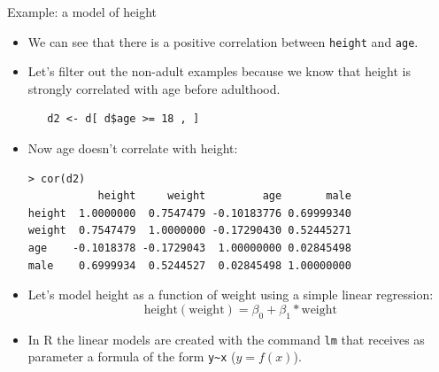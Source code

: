 \documentclass[handout]{beamer}
\begin{document}
\begin{frame}[fragile]{Example: a model of height}
\scriptsize{
\begin{itemize}
 \item We can see that there is a positive correlation between \verb+height+ and \verb+age+.
 
 \item Let's filter out the non-adult examples because we know that height is strongly correlated with age before adulthood. 
 
  \begin{verbatim}
   d2 <- d[ d$age >= 18 , ]
  \end{verbatim}

 \item Now age doesn't correlate with height:
 

  \begin{verbatim}
> cor(d2)
           height     weight         age       male
height  1.0000000  0.7547479 -0.10183776 0.69999340
weight  0.7547479  1.0000000 -0.17290430 0.52445271
age    -0.1018378 -0.1729043  1.00000000 0.02845498
male    0.6999934  0.5244527  0.02845498 1.00000000
  \end{verbatim} 
 
 
 \item Let's model height as a function of weight using a simple linear regression:
 \begin{displaymath}
  \text{height}(\text{weight})=\beta_0+\beta_1*\text{weight}
 \end{displaymath}
 
  \item In R the linear models are created with the command \verb+lm+ that receives as parameter a formula of the form \verb+y~x+ ($y=f(x)$).
 
 

 
 


\end{itemize}
 
 
 
} 
\end{frame}
\end{document}

